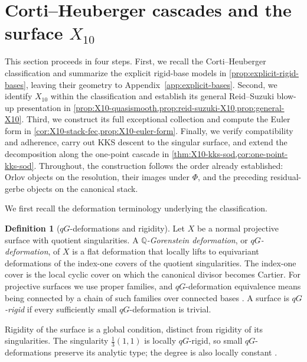 \documentclass[11pt]{article}
\theoremstyle{plain}
\theoremstyle{definition}
\newtheorem{definition}[definition]{Definition}
\theoremstyle{remark}
\begin{document}
\section{Corti--Heuberger cascades and the surface \texorpdfstring{$X_{10}$}{X10}}
\label{sec:cascade}

This section proceeds in four steps. First, we recall the
Corti--Heuberger classification and summarize the explicit rigid-base
models in \cref{prop:explicit-rigid-bases}, leaving their geometry to
Appendix~\ref{app:explicit-bases}. Second, we identify \(X_{10}\) within
the classification and establish its general Reid--Suzuki blow-up
presentation in \cref{prop:X10-quasismooth,prop:reid-suzuki-X10,prop:general-X10}.
Third, we construct its full exceptional collection and compute the Euler
form in \cref{cor:X10-stack-fec,prop:X10-euler-form}. Finally, we verify
compatibility and adherence, carry out KKS descent to the singular
surface, and extend the decomposition along the one-point cascade in
\cref{thm:X10-kks-sod,cor:one-point-kks-sod}.
Throughout, the construction follows the order already established:
Orlov objects on the resolution, their images under \(\Phi\), and the
preceding residual-gerbe objects on the canonical stack.

We first recall the deformation terminology underlying the classification.

\begin{definition}[\(qG\)-deformations and rigidity]
\label{def:qg-deformations}
Let \(X\) be a normal projective surface with quotient singularities.
A \emph{\(\mathbb Q\)-Gorenstein deformation}, or \emph{\(qG\)-deformation},
of \(X\) is a flat deformation that locally lifts to equivariant deformations of
the index-one covers of the quotient singularities. The index-one cover
is the local cyclic cover on which the canonical divisor becomes Cartier.
For projective surfaces we use proper families, and \(qG\)-deformation
equivalence means being connected by a chain of such families over
connected bases \cite[Basic Concepts, Definition~2 and proof of Lemma~6]{AkhtarEtAl2016}.
A surface is \emph{\(qG\)-rigid} if every sufficiently small
\(qG\)-deformation is trivial.
\end{definition}

Rigidity of the surface is a global condition, distinct from rigidity of
its singularities. The singularity \(\frac13(1,1)\) is
locally \(qG\)-rigid, so small \(qG\)-deformations preserve its analytic
type; the degree is also locally constant \cite[Section~1.1.1]{Corti2016}.
\end{document}
